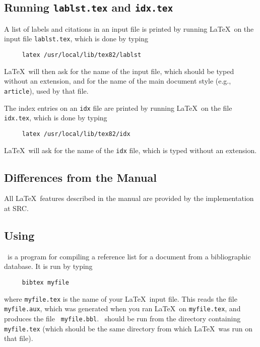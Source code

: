 \subsection{Running {\tt lablst.tex} and {\tt idx.tex}}

A list of labels and citations in an input file is printed
by running \LaTeX\ on the input file \mbox{\tt lablst.tex},
which is done by typing
\begin{verbatim}
     latex /usr/local/lib/tex82/lablst
\end{verbatim}
\LaTeX\ will then ask for the name of the input file, which should be
typed without an extension, and for the name of the main document style
(e.g., \mbox{\tt article}), used by that file.

The index entries on an {\tt idx} file are printed by running \LaTeX\
on the file \mbox{\tt idx.tex}, which is done by typing
\begin{verbatim}
     latex /usr/local/lib/tex82/idx
\end{verbatim}
\LaTeX\ will ask for the name of the {\tt idx} file, which is typed
without an extension.



\subsection{Differences from the Manual}

All \LaTeX\ features described in the manual are provided by 
the implementation at SRC.





\subsection{Using \BibTeX}

\BibTeX\ is a program for compiling a reference list for a document
from a bibliographic database.  It is run by typing
\begin{verbatim}
     bibtex myfile
\end{verbatim}
where \mbox{\tt myfile.tex} is the name of your \LaTeX\ input file.
This reads the file \mbox{\tt myfile.aux}, which was generated when you
ran \LaTeX\ on \mbox{\tt myfile.tex}, and produces the file \mbox{\tt
myfile.bbl}.  \BibTeX\ should be run from the directory containing
\mbox{\tt myfile.tex} (which should be the same directory from which
\LaTeX\ was run on that file).

